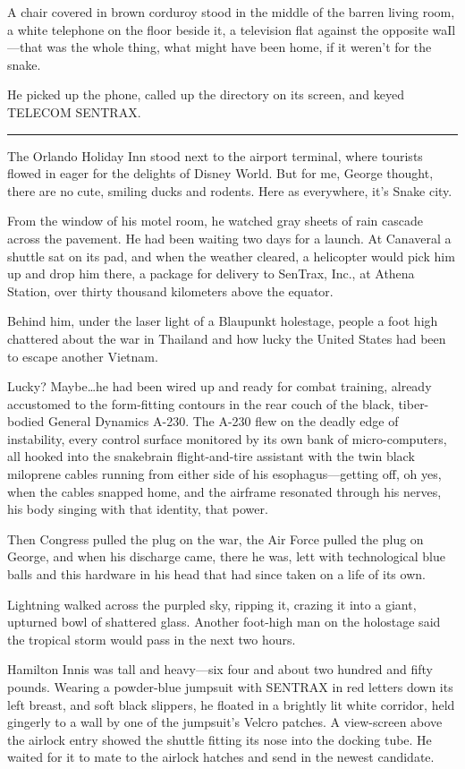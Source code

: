 A chair covered in brown corduroy stood in the middle of the barren living room, a white telephone on the floor beside it, a television flat against the opposite waIl—that was the whole thing, what might have been home, if it weren't for the snake.

He picked up the phone, called up the directory on its screen, and keyed TELECOM SENTRAX.

\fancybreak{* * *}

The Orlando Holiday Inn stood next to the airport terminal, where tourists flowed in eager for the delights of Disney World. But for me, George thought, there are no cute, smiling ducks and rodents. Here as everywhere, it's Snake city.

From the window of his motel room, he watched gray sheets of rain cascade across the pavement. He had been waiting two days for a launch. At Canaveral a shuttle sat on its pad, and when the weather cleared, a helicopter would pick him up and drop him there, a package for delivery to SenTrax, Inc., at Athena Station, over thirty thousand kilometers above the equator.

Behind him, under the laser light of a Blaupunkt holestage, people a foot high chattered about the war in Thailand and how lucky the United States had been to escape another Vietnam.

Lucky? Maybe\ldots he had been wired up and ready for combat training, already accustomed to the form-fitting contours in the rear couch of the black, tiber-bodied General Dynamics A-230. The A-230 flew on the deadly edge of instability, every control surface monitored by its own bank of micro-computers, all hooked into the snakebrain flight-and-tire assistant with the twin black miloprene cables running from either side of his esophagus—getting off, oh yes, when the cables snapped home, and the airframe resonated through his nerves, his body singing with that identity, that power.

Then Congress pulled the plug on the war, the Air Force pulled the plug on George, and when his discharge came, there he was, lett with technological blue balls and this hardware in his head that had since taken on a life of its own.

Lightning walked across the purpled sky, ripping it, crazing it into a giant, upturned bowl of shattered glass. Another foot-high man on the holostage said the tropical storm would pass in the next two hours.

Hamilton Innis was tall and heavy—six four and about two hundred and fifty pounds. Wearing a powder-blue jumpsuit with SENTRAX in red letters down its left breast, and soft black slippers, he floated in a brightly lit white corridor, held gingerly to a wall by one of the jumpsuit's Velcro patches. A view-screen above the airlock entry showed the shuttle fitting its nose into the docking tube. He waited for it to mate to the airlock hatches and send in the newest candidate.

